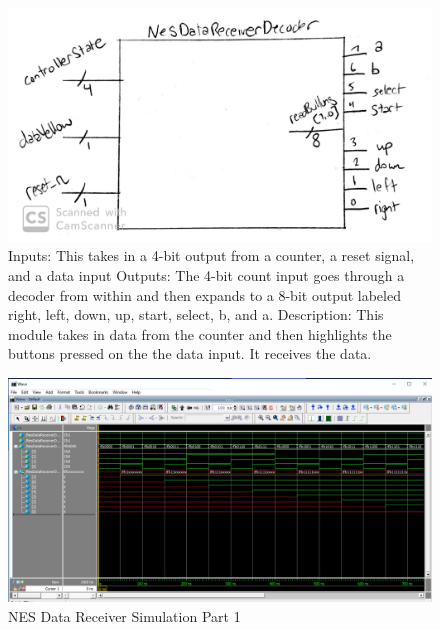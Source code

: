 \documentclass[a4paper]{article}
\begin{document}
\begin{figure}[H]
  \centering
    \includegraphics[width=.85\textwidth]{images/block_diagrams/nes/datareceiver2.jpg}
	\caption{Inputs: This takes in a 4-bit output from a counter, a reset signal, and a data input
Outputs: The 4-bit count input goes through a decoder from within and then expands to a 8-bit output labeled right, left, down, up, start, select, b, and a. 
Description: This module takes in data from the counter and then highlights the buttons pressed on the the data input. It receives the data.}
    \label{fig:data_receiver}
\end{figure}

\begin{figure}[H]
  \centering
    \includegraphics[width=.85\textwidth]{images/ModelSim/nesdatare.JPG}
	\caption{NES Data Receiver Simulation Part 1}
    \label{fig:data_receiver_sim}
\end{figure}
\end{document}
